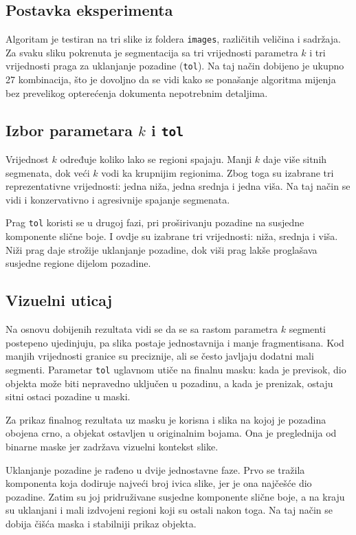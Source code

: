\documentclass[11pt,a4paper]{article}
\begin{document}
\subsection{Postavka eksperimenta}
Algoritam je testiran na tri slike iz foldera \texttt{images}, različitih veličina i sadržaja. Za svaku sliku pokrenuta je segmentacija sa tri vrijednosti parametra $k$ i tri vrijednosti praga za uklanjanje pozadine (\texttt{tol}). Na taj način dobijeno je ukupno 27 kombinacija, što je dovoljno da se vidi kako se ponašanje algoritma mijenja bez prevelikog opterećenja dokumenta nepotrebnim detaljima.

\subsection{Izbor parametara $k$ i \texttt{tol}}
Vrijednost $k$ određuje koliko lako se regioni spajaju. Manji $k$ daje više sitnih segmenata, dok veći $k$ vodi ka krupnijim regionima. Zbog toga su izabrane tri reprezentativne vrijednosti: jedna niža, jedna srednja i jedna viša. Na taj način se vidi i konzervativno i agresivnije spajanje segmenata.

Prag \texttt{tol} koristi se u drugoj fazi, pri proširivanju pozadine na susjedne komponente slične boje. I ovdje su izabrane tri vrijednosti: niža, srednja i viša. Niži prag daje strožije uklanjanje pozadine, dok viši prag lakše proglašava susjedne regione dijelom pozadine.

\subsection{Vizuelni uticaj}
Na osnovu dobijenih rezultata vidi se da se sa rastom parametra $k$ segmenti postepeno ujedinjuju, pa slika postaje jednostavnija i manje fragmentisana. Kod manjih vrijednosti granice su preciznije, ali se često javljaju dodatni mali segmenti. Parametar \texttt{tol} uglavnom utiče na finalnu masku: kada je previsok, dio objekta može biti nepravedno uključen u pozadinu, a kada je prenizak, ostaju sitni ostaci pozadine u maski.

Za prikaz finalnog rezultata uz masku je korisna i slika na kojoj je pozadina obojena crno, a objekat ostavljen u originalnim bojama. Ona je preglednija od binarne maske jer zadržava vizuelni kontekst slike.

Uklanjanje pozadine je rađeno u dvije jednostavne faze. Prvo se tražila komponenta koja dodiruje najveći broj ivica slike, jer je ona najčešće dio pozadine. Zatim su joj pridruživane susjedne komponente slične boje, a na kraju su uklanjani i mali izdvojeni regioni koji su ostali nakon toga. Na taj način se dobija čišća maska i stabilniji prikaz objekta.
\end{document}
